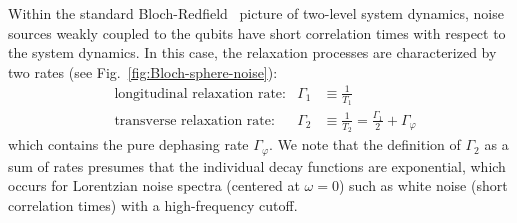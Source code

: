 \documentclass[aip,apr,twocolumn,showpacs,superscriptaddress,groupedaddress,nofootinbib,reprint]{revtex4-1}  %
\begin{document}
Within the standard Bloch-Redfield~\cite{Wangsness1953,Bloch1957,Redfield1957} picture of two-level system dynamics, noise sources weakly coupled to the qubits have short correlation times with respect to the system dynamics. In this case, the relaxation processes are characterized by two rates (see Fig.~\ref{fig:Bloch-sphere-noise}):
\begin{align}
    &\textrm{longitudinal relaxation rate:} &\Gamma_1 &\equiv \frac{1}{T_1}  \\
    &\textrm{transverse relaxation rate:} &\Gamma_2 &\equiv \frac{1}{T_2} = \frac{\Gamma_1}{2} + \Gamma_{\varphi} \label{Eq:T2}
\end{align}
which contains the pure dephasing rate $\Gamma_{\varphi}$. We note that the definition of $\Gamma_2$ as a sum of rates presumes that the individual decay functions are exponential, which occurs for Lorentzian noise spectra (centered at $\omega=0$) such as white noise (short correlation times) with a high-frequency cutoff.
\end{document}
